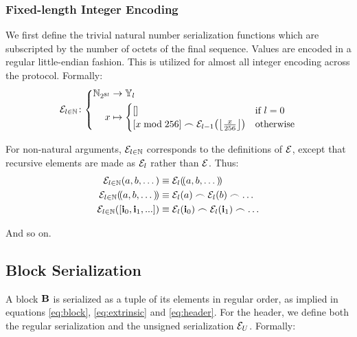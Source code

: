 \subsubsection{Fixed-length Integer Encoding}
We first define the trivial natural number serialization functions which are subscripted by the number of octets of the final sequence. Values are encoded in a regular little-endian fashion. This is utilized for almost all integer encoding across the protocol. Formally:
\begin{equation}
  \se_{l \in \N}\colon\abracegroup{
    \N_{2^{8l}} &\to \blob_l \\
    x &\mapsto \begin{cases}
      [] &\when l = 0 \\
      [x \bmod 256] \concat \se_{l - 1}\left(\left\lfloor \frac{x}{256} \right\rfloor\right) &\otherwise
    \end{cases}
  }
\end{equation}

For non-natural arguments, $\mathcal{E}_{l \in \mathbb{N}}$ corresponds to the definitions of $\mathcal{E}$, except that recursive elements are made as $\mathcal{E}_l$ rather than $\mathcal{E}$. Thus:
\begin{align}
  \se_{l \in \N}(a, b, \dots) &\equiv \se_l(\tup{a, b, \dots})\\
  \se_{l \in \N}(\tup{a, b, \dots}) &\equiv \se_l(a) \concat \se_l(b) \concat \dots\\
  \se_{l \in \N}([\mathbf{i}_0, \mathbf{i}_1, ...]) &\equiv \se_l(\mathbf{i}_0) \concat \se_l(\mathbf{i}_1) \concat \dots
\end{align}

And so on.

\subsection{Block Serialization}

A block $\mathbf{B}$ is serialized as a tuple of its elements in regular order, as implied in equations \ref{eq:block}, \ref{eq:extrinsic} and \ref{eq:header}. For the header, we define both the regular serialization and the unsigned serialization $\mathcal{E}_U$. Formally:


